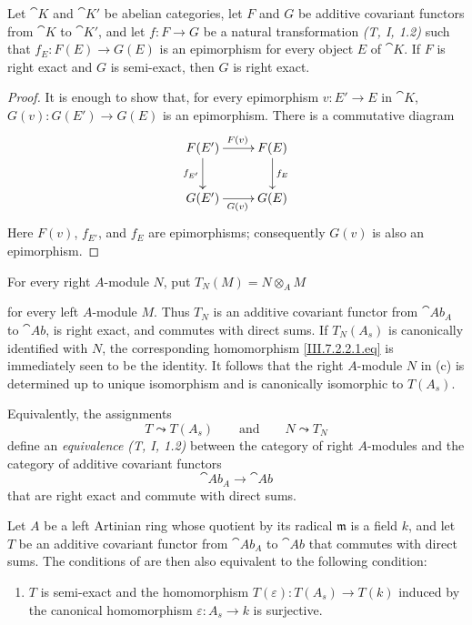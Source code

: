 \begin{lemma}[7.2.5.1]
\label{III.7.2.5.1}
Let $\cat{K}$ and $\cat{K}'$ be abelian categories, let $F$ and
$G$ be additive covariant functors from $\cat{K}$ to
$\cat{K}'$, and let $f:F\longrightarrow G$
be a natural transformation \emph{(T, I, 1.2)} such that $f_E:F(E)\longrightarrow G(E)$
is an epimorphism for every object $E$ of $\cat{K}$.  If $F$ is
right exact and $G$ is semi-exact, then $G$ is right exact.
\end{lemma}

\begin{proof}
It is enough to show that, for every epimorphism
$v:E'\to E$ in $\cat{K}$, $G(v):G(E')\longrightarrow G(E)$
is an epimorphism.  There is a commutative diagram
\[
\xymatrix{
  F(E')\ar[r]^{F(v)}\ar[d]_{f_{E'}}
  & F(E)\ar[d]^{f_E}
  \\
  G(E')\ar[r]_{G(v)}
  & G(E)
}
\]
Here $F(v)$, $f_{E'}$, and $f_E$ are epimorphisms; consequently
$G(v)$ is also an epimorphism.
\end{proof}

\begin{remark}[7.2.6]
\label{III.7.2.6}
For every right $A$-module $N$, put $T_N(M)=N\otimes_A M$
\par\medskip\noindent
for every left $A$-module $M$.  Thus $T_N$ is an additive
covariant functor from $\cat{Ab}_A$ to $\cat{Ab}$, is right
exact, and commutes with direct sums.  If $T_N(A_s)$ is
canonically identified with $N$, the corresponding homomorphism
\eqref{III.7.2.2.1.eq} is immediately seen to be the identity.
It follows that the right $A$-module $N$ in
(c) is determined up to unique isomorphism and
is canonically isomorphic to $T(A_s)$.

Equivalently, the assignments
\[
  T\leadsto T(A_s)
  \qquad\text{and}\qquad
  N\leadsto T_N
\]
define an \emph{equivalence} \emph{(T, I, 1.2)} between the category
of right $A$-modules and the category of additive covariant
functors
\[
  \cat{Ab}_A\longrightarrow\cat{Ab}
\]
that are right exact and commute with direct sums.
\end{remark}

\begin{proposition}[7.2.7]
\label{III.7.2.7}
Let $A$ be a left Artinian ring whose quotient by its radical
$\mathfrak m$ is a field $k$, and let $T$ be an additive
covariant functor from $\cat{Ab}_A$ to $\cat{Ab}$ that commutes
with direct sums.  The conditions of  are then
also equivalent to the following condition:
\begin{enumerate}
  \item[(d)] $T$ is semi-exact and the homomorphism $T(\varepsilon):T(A_s)\longrightarrow T(k)$
    induced by the canonical homomorphism
    $\varepsilon:A_s\to k$ is surjective.
\end{enumerate}
\end{proposition}

